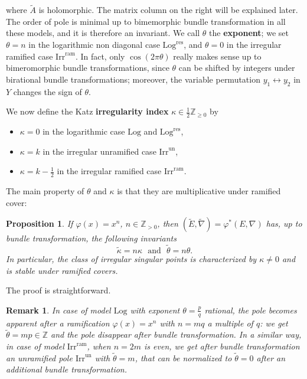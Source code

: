 \documentclass[12]{amsart}
\newtheorem{prop}[thm]{Proposition}
\newtheorem{remark}[thm]{Remark}
\newcommand{\Log}{\boldsymbol{\mathrm{Log}}}
\newcommand{\Logres}{\boldsymbol{\mathrm{Log}^{\mathrm{res}}}}
\newcommand{\Irrun}{\boldsymbol{\mathrm{Irr}^{\mathrm{un}}}}
\newcommand{\Irram}{\boldsymbol{\mathrm{Irr}^{\mathrm{ram}}}}
\begin{document}
where $\tilde A$ is holomorphic. The matrix column on the right will be explained later.
The order of pole is minimal up to bimemorphic bundle transformation in all these models,
and it is therefore an invariant.
We call $\theta$ the {\bf exponent}; we set $\theta=n$ in the logarithmic non diagonal case $\Logres$, and
$\theta=0$ in the irregular ramified case $\Irram$.
In fact, only $\cos(2\pi\theta)$ really makes sense up to bimeromorphic bundle transformations, since 
$\theta$ can be shifted by integers under birational bundle transformations;
moreover, the variable permutation $y_1\leftrightarrow y_2$ in $Y$ changes the sign of $\theta$.

We now define the Katz {\bf irregularity index} $\kappa\in\frac{1}{2}\mathbb Z_{\ge0}$ by 
\begin{itemize}
\item $\kappa=0$ in the logarithmic case $\Log$ and $\Logres$,
\item $\kappa=k$ in the irregular unramified case $\Irrun$,
\item $\kappa=k-\frac{1}{2}$ in the irregular ramified case $\Irram$.
\end{itemize}
The main property of $\theta$ and $\kappa$ is that they are multiplicative under ramified cover:

\begin{prop}\label{Prop:ramificationindex}
If $\varphi(x)=x^n$, $n\in\mathbb Z_{>0}$, then $(\tilde E,\tilde\nabla)=\varphi^*(E,\nabla)$ has, 
up to bundle transformation, the following invariants
$$ \tilde \kappa=n\kappa\ \ \ \text{and}\ \ \ \tilde\theta=n\theta.$$
In particular, the class of irregular singular points is characterized by $\kappa\not=0$ and is stable
under ramified covers. 
\end{prop}

The proof is straightforward.

\begin{remark}\label{Rem:ramificationindex}In case of model $\Log$ with exponent $\theta=\frac{p}{q}$
rational, the pole becomes apparent after a ramification $\varphi(x)=x^n$ with $n=mq$ a multiple of $q$:
we get $\tilde\theta=mp\in\mathbb Z$ and the pole disappear after bundle transformation.
In a similar way, in case of model $\Irram$, when $n=2m$ is even, we get after bundle transformation
an unramified pole $\Irrun$ with $\tilde\theta=m$, that can be normalized to $\tilde\theta=0$ 
after an additional bundle transformation. 
\end{remark}
\end{document}
